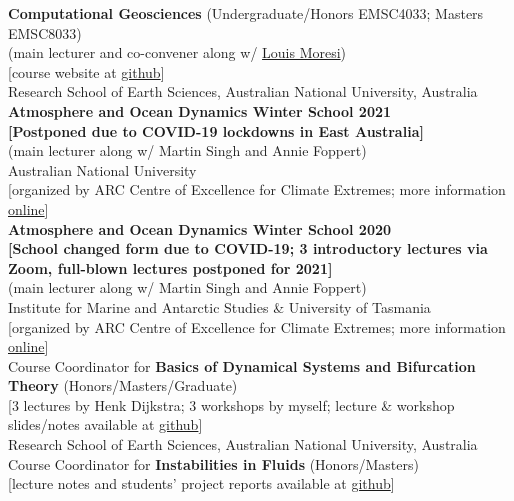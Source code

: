 \documentclass[10pt, letter]{article}
\newcommand{\years}[1]{\marginnote{\scriptsize #1}}
\begin{document}
\noindent\years{2021 -- today}\textbf{Computational Geosciences} (Undergraduate/Honors EMSC4033; Masters EMSC8033)\\
(main lecturer and co-convener along w/ \href{http://www.moresi.info}{\color{black}Louis Moresi})\\[0pt]
[course website at \href{https://github.com/ANU-RSES-Education/EMSC-4033}{github}]\\
Research School of Earth Sciences, Australian National University, Australia\\[.2cm]
\noindent\years{Jun.~2021}\textbf{Atmosphere and Ocean Dynamics Winter School 2021}\\
\textbf{[Postponed due to COVID-19 lockdowns in East Australia]}\\
(main lecturer along w/ Martin Singh and Annie Foppert)\\[0pt] 
Australian National University\\[0pt] 
[organized by ARC Centre of Excellence for Climate Extremes; more information \href{https://climateextremes.org.au/winter-school-2021-atmosphere-and-ocean-dynamics/}{online}]\\[.2cm]
\noindent\years{Jun.~2020}\textbf{Atmosphere and Ocean Dynamics Winter School 2020}\\
\textbf{[School changed form due to COVID-19; 3 introductory lectures via Zoom, full-blown lectures postponed for 2021]}\\
(main lecturer along w/ Martin Singh and Annie Foppert)\\[0pt] 
Institute for Marine and Antarctic Studies \& University of Tasmania\\[0pt] 
[organized by ARC Centre of Excellence for Climate Extremes; more information \href{https://climateextremes.org.au/clex-winter-school-2020-atmosphere-and-ocean-dynamics/}{online}]\\[.2cm]
\noindent\years{2020}Course Coordinator for \textbf{Basics of Dynamical Systems and Bifurcation Theory} (Honors/Masters/Graduate)\\[0pt] [3 lectures by Henk Dijkstra; 3 workshops by myself; lecture \& workshop slides/notes available at \href{https://github.com/ClimateFluidPhysics-ANU/DynamicalSystems-BifurcationTheory}{github}]\\
Research School of Earth Sciences, Australian National University, Australia\\[.2cm]
\noindent\years{2018}Course Coordinator for \textbf{Instabilities in Fluids} (Honors/Masters)\\[0pt] [lecture notes and students' project reports available at \href{https://github.com/navidcy/Instabilities-in-Fluids}{github}]\\
\end{document}
